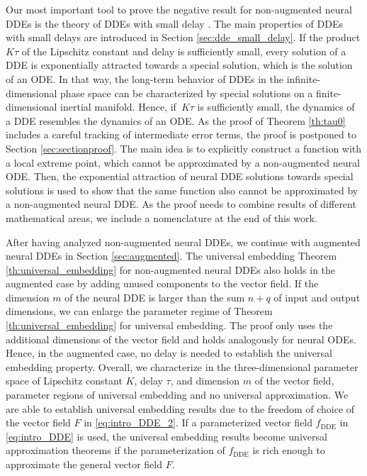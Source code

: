 \documentclass[10pt]{article}
\numberwithin{equation}{section}
\begin{document}
	Our most important tool to prove the negative result for non-augmented neural DDEs is the theory of DDEs with small delay \cite{Chicone2003,Chicone2004a,Driver1968,Driver1976,Jarnik1975}. The main properties of DDEs with small delays are introduced in Section \ref{sec:dde_small_delay}. If the product $K \tau$ of the Lipschitz constant and delay is sufficiently small, every solution of a DDE is exponentially attracted towards a special solution, which is the solution of an ODE. In that way, the long-term behavior of DDEs in the infinite-dimensional phase space can be characterized by special solutions on a finite-dimensional inertial manifold. Hence, if~$K\tau$ is sufficiently small, the dynamics of a DDE resembles the dynamics of an ODE. As the proof of Theorem \ref{th:tau0} includes a careful tracking of intermediate error terms, the proof is postponed to Section \ref{sec:sectionproof}. The main idea is to explicitly construct a function with a local extreme point, which cannot be approximated by a non-augmented neural ODE. Then, the exponential attraction of neural DDE solutions towards special solutions is used to show that the same function also cannot be approximated by a non-augmented neural DDE. As the proof needs to combine results of different mathematical areas, we include a nomenclature at the end of this work.
	
	After having analyzed non-augmented neural DDEs, we continue with augmented neural DDEs in Section \ref{sec:augmented}. The universal embedding Theorem \ref{th:universal_embedding} for non-augmented neural DDEs also holds in the augmented case by adding unused components to the vector field. If the dimension $m$ of the neural DDE is larger than the sum $n+q$ of input and output dimensions, we can enlarge the parameter regime of Theorem \ref{th:universal_embedding} for universal embedding. The proof only uses the additional dimensions of the vector field and holds analogously for neural ODEs. Hence, in the augmented case, no delay is needed to establish the universal embedding property. Overall, we characterize in the three-dimensional parameter space of Lipschitz constant $K$, delay $\tau$, and dimension $m$ of the vector field, parameter regions of universal embedding and no universal approximation. We are able to establish universal embedding results due to the freedom of choice of the vector field $F$ in \eqref{eq:intro_DDE_2}. If a parameterized vector field $f_\text{DDE}$ in \eqref{eq:intro_DDE} is used, the universal embedding results become universal approximation theorems if the parameterization of $f_\text{DDE}$ is rich enough to approximate the general vector field $F$.
	
\end{document}
